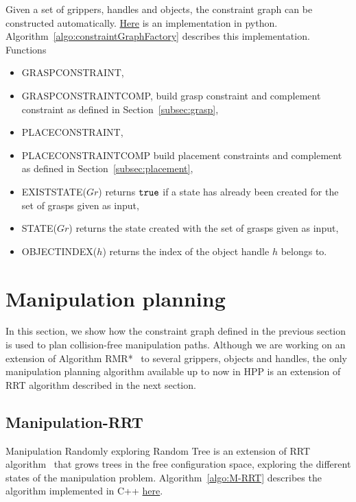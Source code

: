 Given a set of grippers, handles and objects, the constraint graph can be constructed automatically. \href{https://github.com/humanoid-path-planner/hpp-manipulation-corba/blob/5af1b3bad68e8c339d5f42eb72173d7356504532/src/hpp/corbaserver/manipulation/constraint_graph_factory.py#L187}{Here} is an implementation in python. Algorithm~\ref{algo:constraintGraphFactory} describes this implementation.
Functions
\begin{itemize}
\item {\scriptsize GRASP}{\small C}{\scriptsize ONSTRAINT},
\item {\scriptsize GRASP}{\small C}{\scriptsize ONSTRAINT}{\small C}{\scriptsize OMP}, build grasp constraint and complement constraint as defined in Section~\ref{subsec:grasp},
\item {\scriptsize PLACE}{\small C}{\scriptsize ONSTRAINT},
\item {\scriptsize PLACE}{\small C}{\scriptsize ONSTRAINT}{\small C}{\scriptsize OMP} build placement constraints and complement as defined in Section~\ref{subsec:placement},
\item {\scriptsize EXIST}{\small S}{\scriptsize TATE}($Gr$) returns $\texttt{true}$ if a state has already been created for the set of grasps given as input,
\item{\scriptsize STATE}($Gr$) returns the state created with the set of grasps given as input,
\item {\scriptsize OBJECT}{\small I}{\scriptsize NDEX}($h$) returns the index of the object handle $h$ belongs to.
\end{itemize}

\section{Manipulation planning}\label{sec:manipulation-planning}

In this section, we show how the constraint graph defined in the previous section is used to plan collision-free manipulation paths. Although we are working on an extension of Algorithm RMR*~\cite{schmitt17icra} to several grippers, objects and handles, the only manipulation planning algorithm available up to now in HPP is an extension of RRT algorithm described in the next section.

\subsection{Manipulation-RRT}

Manipulation Randomly exploring Random Tree is an extension of RRT algorithm~\cite{LavKuf01b} that grows trees in the free configuration space, exploring the different states of the manipulation problem. Algorithm~\ref{algo:M-RRT} describes the algorithm implemented in C++ \href{https://github.com/humanoid-path-planner/hpp-manipulation/blob/16369aa291ab1b17ef6176ae8b8b2512b5e6fff7/src/manipulation-planner.cc#L159}{here}.

